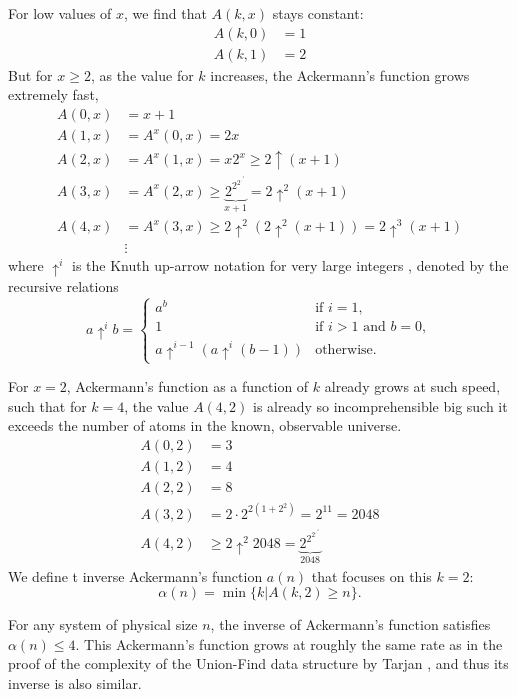 For low values of $x$, we find that $A(k,x)$ stays constant:
\begin{align*}
    A(k,0) &= 1 \\
    A(k,1) &= 2
\end{align*}
But for $x\geq 2$, as the value for $k$ increases, the Ackermann's function grows extremely fast,
\begin{align*}
    A(0,x) &= x+1 \\
    A(1,x) &= A^x(0,x) = 2x  \\
    A(2,x) &= A^x(1,x) = x2^x \geq 2 \uparrow (x+1)\\
    A(3,x) &= A^x(2,x) \geq  \underbrace{2^{2^{2^{.^{.^2}}}}}_{x+1} = 2\uparrow ^2 (x+1) \\
    A(4,x) &= A^x(3,x) \geq 2\uparrow^2(2\uparrow^2(x+1)) = 2\uparrow ^3 (x+1)\\
    &\vdots
\end{align*}
where $\uparrow^i$ is the Knuth up-arrow notation for very large integers \cite{knuth1976mathematics}, denoted by the recursive relations
\begin{equation}
    a\uparrow^i b = \begin{cases}
        a^b &\text{if }i=1,\\
        1   &\text{if }i>1 \text{ and } b=0,\\
        a\uparrow^{i-1}(a \uparrow^i(b-1)) &\text{otherwise.}
    \end{cases}
\end{equation}

For $x=2$, Ackermann's function as a function of $k$ already grows at such speed, such that for $k=4$, the value $A(4,2)$ is already so incomprehensible big such it exceeds the number of atoms in the known, observable universe. 
\begin{align*}
    A(0,2) &= 3 \\
    A(1,2) &= 4  \\
    A(2,2) &= 8\\
    A(3,2) &= 2\cdot 2^{2(1+2^2)} = 2^11 = 2048\\
    A(4,2) &\geq 2\uparrow^2 2048 = \underbrace{2^{2^{2^{.^{.^2}}}}}_{2048}
\end{align*}
We define t inverse Ackermann's function $a(n)$ that focuses on this $k=2$:
\begin{equation}
    \alpha(n) = \min\{k | A(k,2) \geq n \}.
\end{equation}

For any system of physical size $n$, the inverse of Ackermann's function satisfies $\alpha(n) \leq 4$. This Ackermann's function grows at roughly the same rate as in the proof of the complexity of the Union-Find data structure by Tarjan \cite{tarjan1975efficiency}, and thus its inverse is also similar.
